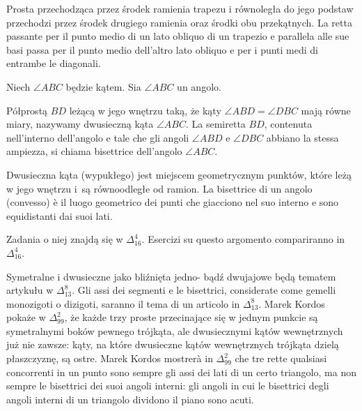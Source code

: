 \begin{corollary}
	Prosta przechodząca przez środek ramienia trapezu i równoległa do jego podstaw przechodzi przez środek drugiego ramienia oraz środki obu przekątnych. %
	La retta passante per il punto medio di un lato obliquo di un trapezio e parallela alle sue basi passa per il punto medio dell'altro lato obliquo e per i punti medi di entrambe le diagonali. %
\end{corollary}

\begin{definition}
[dwusieczna] %
[bisettrice] %
	Niech $\angle ABC$ będzie kątem. %
	Sia $\angle ABC$ un angolo. %

	Półprostą $BD$ leżącą w jego wnętrzu taką, że kąty $\angle ABD = \angle DBC$ mają równe miary, nazywamy dwusieczną kąta $\angle ABC$. %
	La semiretta $BD$, contenuta nell'interno dell'angolo e tale che gli angoli $\angle ABD$ e $\angle DBC$ abbiano la stessa ampiezza, si chiama bisettrice dell'angolo $\angle ABC$. %
\end{definition}

Dwusieczna kąta (wypukłego) jest miejscem geometrycznym punktów, które leżą w jego wnętrzu i~są równoodległe od ramion. %
La bisettrice di un angolo (convesso) è il luogo geometrico dei punti che giacciono nel suo interno e sono equidistanti dai suoi lati. %

Zadania o niej znajdą się w $\Delta_{16}^{4}$. %
Esercizi su questo argomento compariranno in $\Delta_{16}^{4}$. %

Symetralne i dwusieczne jako bliźnięta jedno- bądź dwujajowe będą tematem artykułu w $\Delta_{13}^8$. %
Gli assi dei segmenti e le bisettrici, considerate come gemelli monozigoti o dizigoti, saranno il tema di un articolo in $\Delta_{13}^8$. %
Marek Kordos pokaże w $\Delta_{99}^2$, że każde trzy proste przecinające się w jednym punkcie są symetralnymi boków pewnego trójkąta, ale dwusiecznymi kątów wewnętrznych już nie zawsze: kąty, na które dwusieczne kątów wewnętrznych trójkąta dzielą płaszczyznę, są ostre. %
Marek Kordos mostrerà in $\Delta_{99}^2$ che tre rette qualsiasi concorrenti in un punto sono sempre gli assi dei lati di un certo triangolo, ma non sempre le bisettrici dei suoi angoli interni: gli angoli in cui le bisettrici degli angoli interni di un triangolo dividono il piano sono acuti. %


